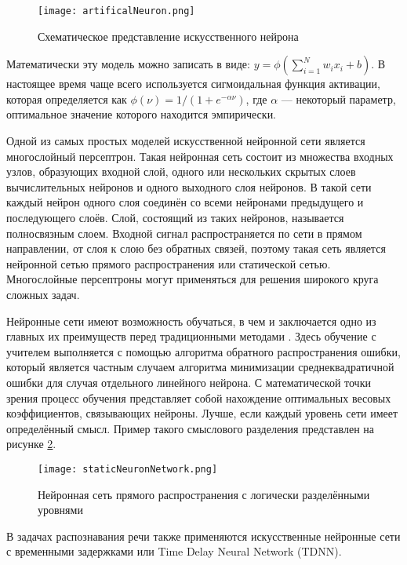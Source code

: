 \begin{figure}[h]
	\centering
	\texttt{[image: artificalNeuron.png]}
	\caption{Схематическое представление искусственного нейрона}
	\label{fig:artificalNeuron}
\end{figure}

Математически эту модель можно записать в виде: $y = \phi( \sum_{i=1}^N w_i x_i + b)$.
В настоящее время чаще всего используется сигмоидальная функция активации, которая определяется как $\phi(\nu) = 1 / (1 + e^{-\alpha \nu})$, где $\alpha$ --- некоторый параметр, оптимальное значение которого находится эмпирически.

Одной из самых простых моделей искусственной нейронной сети является многослойный персептрон.
Такая нейронная сеть состоит из множества входных узлов, образующих входной слой, одного или нескольких скрытых слоев вычислительных нейронов и одного выходного слоя нейронов.
В такой сети каждый нейрон одного слоя соединён со всеми нейронами предыдущего и последующего слоёв.
Слой, состоящий из таких нейронов, называется полносвязным слоем.
Входной сигнал распространяется по сети в прямом направлении, от слоя к слою без обратных связей, поэтому такая сеть является нейронной сетью прямого распространения или статической сетью.
Многослойные персептроны могут применяться для решения широкого круга сложных задач.

Нейронные сети имеют возможность обучаться, в чем и заключается одно из главных их преимуществ перед традиционными методами \cite{nikolenko2017}.
Здесь обучение с учителем выполняется с помощью алгоритма обратного распространения ошибки, который является частным случаем алгоритма минимизации среднеквадратичной ошибки для случая отдельного линейного нейрона.
С математической точки зрения процесс обучения представляет собой нахождение оптимальных весовых коэффициентов, связывающих нейроны.
Лучше, если каждый уровень сети имеет определённый смысл.
Пример такого смыслового разделения представлен на рисунке \ref{fig:staticNeuronNetwork}.

\begin{figure}[h]
	\centering
	\texttt{[image: staticNeuronNetwork.png]}
	\caption{Нейронная сеть прямого распространения с логически разделёнными уровнями}
	\label{fig:staticNeuronNetwork}
\end{figure}

В задачах распознавания речи также применяются искусственные нейронные сети с временными задержками или Time Delay Neural Network (TDNN).

